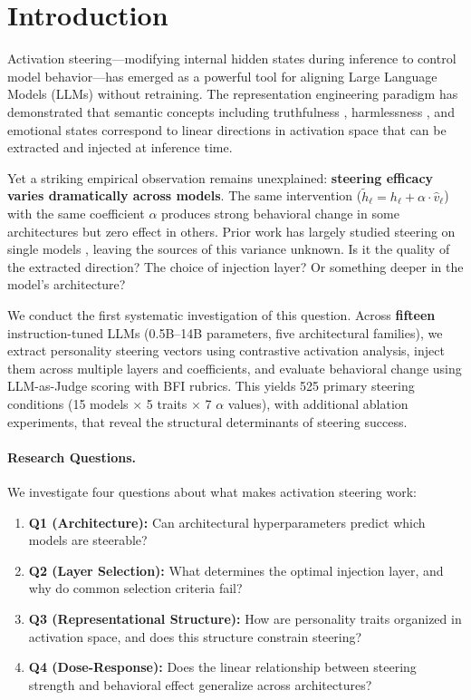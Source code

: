 \documentclass{article}
\begin{document}
\section{Introduction}\label{sec:intro}

Activation steering---modifying internal hidden states during inference to control model behavior---has emerged as a powerful tool for aligning Large Language Models (LLMs) without retraining. The representation engineering paradigm \citep{zou2023representation} has demonstrated that semantic concepts including truthfulness \citep{li2024iti}, harmlessness \citep{rimsky2024steering}, and emotional states \citep{bao2024emotion} correspond to linear directions in activation space that can be extracted and injected at inference time.

Yet a striking empirical observation remains unexplained: \textbf{steering efficacy varies dramatically across models}. The same intervention ($\tilde{h}_\ell = h_\ell + \alpha \cdot \hat{v}_\ell$) with the same coefficient $\alpha$ produces strong behavioral change in some architectures but zero effect in others. Prior work has largely studied steering on single models \citep{feng2026persona, rimsky2024steering, li2024iti}, leaving the sources of this variance unknown. Is it the quality of the extracted direction? The choice of injection layer? Or something deeper in the model's architecture?

We conduct the first systematic investigation of this question. Across \textbf{fifteen} instruction-tuned LLMs (0.5B--14B parameters, five architectural families), we extract personality steering vectors using contrastive activation analysis, inject them across multiple layers and coefficients, and evaluate behavioral change using LLM-as-Judge scoring with BFI rubrics. This yields 525 primary steering conditions (15 models $\times$ 5 traits $\times$ 7 $\alpha$ values), with additional ablation experiments, that reveal the structural determinants of steering success.

\paragraph{Research Questions.} We investigate four questions about what makes activation steering work:
\begin{enumerate}[leftmargin=*,topsep=2pt,itemsep=1pt]
    \item \textbf{Q1 (Architecture):} Can architectural hyperparameters predict which models are steerable?
    \item \textbf{Q2 (Layer Selection):} What determines the optimal injection layer, and why do common selection criteria fail?
    \item \textbf{Q3 (Representational Structure):} How are personality traits organized in activation space, and does this structure constrain steering?
    \item \textbf{Q4 (Dose-Response):} Does the linear relationship between steering strength and behavioral effect generalize across architectures?
\end{enumerate}
\end{document}
